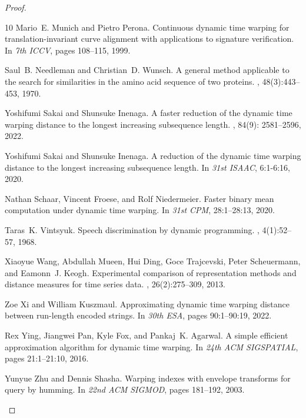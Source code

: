 \documentclass[a4paper,UKenglish,cleveref, autoref, thm-restate]{lipics-v2021}
\begin{document}
\begin{proof}
\begin{thebibliography}{10}
Mario~E. Munich and Pietro Perona.
\newblock Continuous dynamic time warping for translation-invariant curve
  alignment with applications to signature verification.
\newblock In {\em 7th {ICCV}}, pages 108--115, 1999.

Saul~B. Needleman and Christian~D. Wunsch.
\newblock A general method applicable to the search for similarities in the
  amino acid sequence of two proteins.
, 48(3):443--453, 1970.

Yoshifumi Sakai and Shunsuke Inenaga.
\newblock A faster reduction of the dynamic time warping distance to the
  longest increasing subsequence length. 
 , 84(9): 2581--2596, 2022.

Yoshifumi Sakai and Shunsuke Inenaga.
\newblock A reduction of the dynamic time warping distance to the longest
  increasing subsequence length.
\newblock In {\em 31st {ISAAC}}, 6:1-6:16, 2020.

Nathan Schaar, Vincent Froese, and Rolf Niedermeier.
\newblock Faster binary mean computation under dynamic time warping.
\newblock In {\em 31st {CPM}}, 28:1--28:13, 2020.

Taras~K. Vintsyuk.
\newblock Speech discrimination by dynamic programming.
, 4(1):52--57, 1968.

Xiaoyue Wang, Abdullah Mueen, Hui Ding, Goce Trajcevski, Peter Scheuermann, and
  Eamonn~J. Keogh.
\newblock Experimental comparison of representation methods and distance
  measures for time series data.
, 26(2):275--309, 2013.

Zoe Xi and William Kuszmaul.
\newblock Approximating dynamic time warping distance between run-length
  encoded strings.
\newblock In {\em 30th {ESA}}, pages 90:1--90:19, 2022.

Rex Ying, Jiangwei Pan, Kyle Fox, and Pankaj~K. Agarwal.
\newblock A simple efficient approximation algorithm for dynamic time warping.
\newblock In {\em 24th {ACM SIGSPATIAL}}, pages 21:1--21:10, 2016.

Yunyue Zhu and Dennis Shasha.
\newblock Warping indexes with envelope transforms for query by humming.
\newblock In {\em 22nd {ACM SIGMOD}}, pages 181--192, 2003.


\end{thebibliography}
\end{proof}
\end{document}
